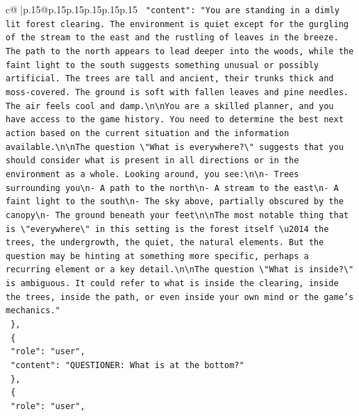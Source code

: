 \documentclass{article}
\begin{document}
{\begin{supertabular}{c@{$\;$}|p{.15\linewidth}@{}p{.15\linewidth}p{.15\linewidth}p{.15\linewidth}p{.15\linewidth}p{.15\linewidth}}
{{{\texttt{    "content": "You are standing in a dimly lit forest clearing. The environment is quiet except for the gurgling of the stream to the east and the rustling of leaves in the breeze. The path to the north appears to lead deeper into the woods, while the faint light to the south suggests something unusual or possibly artificial. The trees are tall and ancient, their trunks thick and moss{-}covered. The ground is soft with fallen leaves and pine needles. The air feels cool and damp.\textbackslash{}n\textbackslash{}nYou are a skilled planner, and you have access to the game history. You need to determine the best next action based on the current situation and the information available.\textbackslash{}n\textbackslash{}nThe question \textbackslash{}"What is everywhere?\textbackslash{}" suggests that you should consider what is present in all directions or in the environment as a whole. Looking around, you see:\textbackslash{}n\textbackslash{}n{-} Trees surrounding you\textbackslash{}n{-} A path to the north\textbackslash{}n{-} A stream to the east\textbackslash{}n{-} A faint light to the south\textbackslash{}n{-} The sky above, partially obscured by the canopy\textbackslash{}n{-} The ground beneath your feet\textbackslash{}n\textbackslash{}nThe most notable thing that is \textbackslash{}"everywhere\textbackslash{}" in this setting is the forest itself \textbackslash{}u2014 the trees, the undergrowth, the quiet, the natural elements. But the question may be hinting at something more specific, perhaps a recurring element or a key detail.\textbackslash{}n\textbackslash{}nThe question \textbackslash{}"What is inside?\textbackslash{}" is ambiguous. It could refer to what is inside the clearing, inside the trees, inside the path, or even inside your own mind or the game's mechanics."} \\
\texttt{  \},} \\
\texttt{  \{} \\
\texttt{    "role": "user",} \\
\texttt{    "content": "QUESTIONER: What is at the bottom?"} \\
\texttt{  \},} \\
\texttt{  \{} \\
\texttt{    "role": "user",} \\
}}}
\end{supertabular}}
\end{document}
